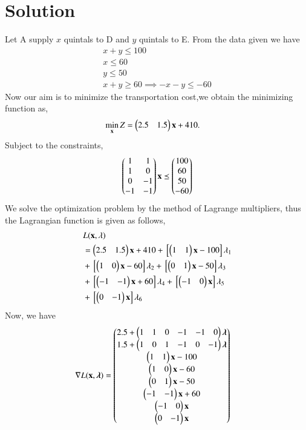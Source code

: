 \documentclass[journal,12pt,twocolumn]{IEEEtran}
\begin{document}
\section{Solution}
Let A supply $x$ quintals to D and $y$ quintals to E.
From the data given we have 
\begin{align}
    x+y\leq100 \\
    x\leq60 \\ 
    y\leq50 \\
    x+y\geq60 \implies -x-y\leq-60
\end{align}
Now our aim is to minimize the transportation cost,we obtain the minimizing function as,
\begin{align}
    \min_{\mathbf{x}} Z &= \begin{pmatrix}2.5 & 1.5\end{pmatrix}\mathbf{x}+410. \label{eq:1}
\end{align}
Subject to the constraints,
\begin{align}
    \begin{pmatrix}1 & 1 \\ 1 & 0 \\ 0 & -1 \\ -1 & -1\end{pmatrix}\mathbf{x} \preceq \begin{pmatrix}100 \\ 60 \\ 50 \\ -60\end{pmatrix}
\end{align}
We solve the optimization problem by the method of Lagrange multipliers, thus the Lagrangian function is given as follows,
\begin{equation}
  \begin{aligned}
     &L(\mathbf{x},\lambda) \\ &= \begin{pmatrix}2.5 & 1.5\end{pmatrix}\mathbf{x}+410+{}\left[\begin{pmatrix}1 & 1\end{pmatrix}\mathbf{x}-100\right]\lambda_1 \\ &+ {}\left[\begin{pmatrix}1 & 0\end{pmatrix}\mathbf{x}-60\right]\lambda_2 +{}\left[\begin{pmatrix}0 & 1\end{pmatrix}\mathbf{x}-50\right]\lambda_3 \\ &+ {}\left[\begin{pmatrix}-1 & -1\end{pmatrix}\mathbf{x}+60\right]\lambda_4 +{}\left[\begin{pmatrix}-1 & 0\end{pmatrix}\mathbf{x}\right]\lambda_5 \\ &+{}\left[\begin{pmatrix}0 & -1\end{pmatrix}\mathbf{x}\right]\lambda_6
\end{aligned}  
\end{equation}
Now, we have 
\begin{align}
    \nabla L(\mathbf{x},\boldsymbol{\lambda}) &= \begin{pmatrix}2.5+ \begin{pmatrix}1 & 1 & 0 & -1 & -1 & 0\end{pmatrix}\boldsymbol{\lambda}\\ 1.5+\begin{pmatrix}1 & 0 & 1 & -1 & 0 & -1\end{pmatrix}\boldsymbol{\lambda} \\ \begin{pmatrix}1 & 1\end{pmatrix}\mathbf{x}-100 \\ \begin{pmatrix}1 & 0\end{pmatrix}\mathbf{x}-60 \\ \begin{pmatrix}0 & 1\end{pmatrix}\mathbf{x}-50 \\ \begin{pmatrix}-1 & -1\end{pmatrix}\mathbf{x}+60 \\ \begin{pmatrix}-1 & 0\end{pmatrix}\mathbf{x} \\ \begin{pmatrix}0 & -1\end{pmatrix}\mathbf{x}\end{pmatrix}
\end{align}
\end{document}
